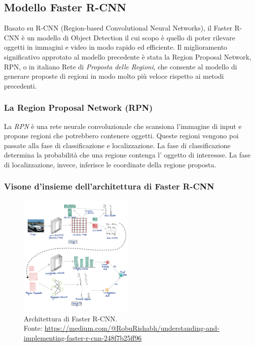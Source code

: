 \subsection{Modello Faster R-CNN}
Basato su R-CNN (Region-based Convolutional Neural Networks), il Faster R-CNN è un modello di Object 
Detection il cui scopo è quello di poter rilevare oggetti in immagini e video in modo rapido ed efficiente.
Il miglioramento significativo approtato al modello precedente è stata la Region Proposal Network, RPN,
o in italiano Rete di \textit{Proposta delle Regioni}, che consente al modello di generare proposte di regioni in modo molto più veloce
rispetto ai metodi precedenti.\\

\subsubsection{La Region Proposal Network (RPN)}
La \textit{RPN} è una rete neurale convoluzionale che scansiona l'immagine di input e propone
regioni che potrebbero contenere oggetti. Queste regioni vengono poi passate alla fase di classificazione
e localizzazione. La fase di classificazione determina la probabilità che una regione contenga 
l' oggetto di interessse. La fase di localizzazione, invece, inferisce le coordinate della regione proposta.

\subsubsection{Visone d'insieme dell'architettura di Faster R-CNN}

\begin{figure}[H]
    \centering
    \includegraphics[width=0.5\textwidth]{images/faster_rcnn_architecture.png}
        \caption{Architettura di Faster R-CNN.\\
        Fonte: \url{https://medium.com/@RobuRishabh/understanding-and-implementing-faster-r-cnn-248f7b25ff96}}
    \label{fig:faster-rcnn-architecture}
\end{figure}


